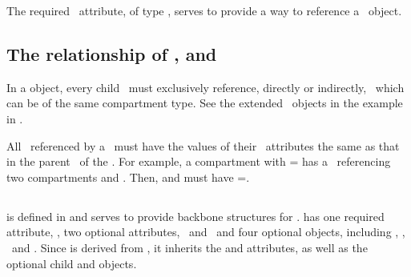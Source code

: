 The required \compartmentAtt\ attribute, of type \SIdRefPT, serves to provide a way to reference a \ExCompartment\ object. 

\label{def:CompartmentCircularReferencesNotAllowed}

\subsection{The relationship of ,  and }
\label{def:Relationships_CompartmentReferences}

In a  object, every \mBlockChangedBegin{\revTwentyTwentyMarch}child\mBlockChangedEnd{\revTwentyTwentyMarch} \compartmentReferences\ must exclusively reference, directly or indirectly,  \compartment\ which can be of the same compartment type. See the extended \ExCompartment\ objects in the example in .

All \compartments\ referenced by a \listOfCompartmentReferences\ must have the values of their \isTypeAtt\ attributes the same as that in the parent \compartment\ of the \listOfCompartmentReferences. For example, a compartment  with \isTypeAtt= has a \listOfCompartmentReferences\ referencing two compartments  and . Then,  and  must have \isTypeAtt=. 


\subsection{}
\label{def:SpeciesType}

 is defined in  and serves to provide backbone structures for \species.  has  one required attribute, \idAtt, two optional attributes, \nameAtt\ and \compartmentAtt\ and four optional  objects\mBlockChangedBegin{\revTwentyTwentyMarch}, including\mBlockChangedEnd{\revTwentyTwentyMarch} \ListOfSpeciesFeatureTypes, \ListOfSpeciesTypeInstances, \ListOfInSpeciesTypeBonds\ and \ListOfSpeciesTypeComponentIndexes .  Since  is derived from , it inherits the  and  attributes, as well as the optional \mBlockChangedBegin{\revTwentyTwentyMarch}child\mBlockChangedEnd{\revTwentyTwentyMarch}  and  objects.  

